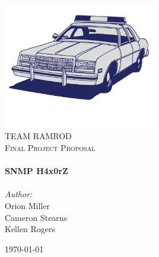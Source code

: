 

\begin{titlepage}
\begin{center}

\includegraphics[width=0.5\textwidth]{./figures/logo.png}
\\[1cm]

\textsc{\LARGE TEAM RAMROD}\\[1.5cm]

\textsc{\Large Final Project Proposal}\\[0.5cm]

\HRule \\[0.4cm]
{\Huge \bfseries SNMP H4x0rZ}\\[0.4cm]
\HRule \\[1.5cm]

{\large
 \emph{Author:}\\
 Orion Miller\\
 Cameron Stearns\\
 Kellen Rogers\\
}

\vfill

{\large \today}

\end{center}
\end{titlepage}
